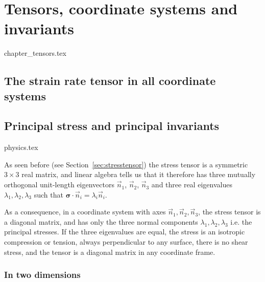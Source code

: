 \chapter{Tensors, coordinate systems and invariants}
\begin{flushright} {\tiny {\color{gray} chapter\_tensors.tex}} \end{flushright}


\section{The strain rate tensor in all coordinate systems}


\newpage
\section{Principal stress and principal invariants} \label{sec:princ_stress}
\begin{flushright} {\tiny {\color{gray} physics.tex}} \end{flushright}


As seen before (see Section~\ref{sec:stresstensor}) 
the stress tensor is a symmetric $3\times3$ real matrix, and linear algebra tells us that it 
therefore has three mutually orthogonal unit-length eigenvectors $\vec{n}_{1}$, $\vec{n}_{2}$, 
$\vec{n}_{3}$ and three real eigenvalues $\lambda _{1},\lambda _{2},\lambda _{3}$ 
such that ${\bm \sigma}\!\cdot\! \vec{n}_i=\lambda_{i} \vec{n}_{i}$.

As a consequence, in a coordinate system with axes $\vec{n}_{1},\vec{n}_{2},\vec{n}_{3}$, 
the stress tensor is a diagonal matrix, and has only the three normal components $\lambda _{1},\lambda _{2},\lambda _{3}$
i.e. the principal stresses. If the three eigenvalues are equal, the stress is an isotropic compression or tension, always perpendicular to any surface, there is no shear stress, and the tensor is a diagonal matrix in any coordinate frame.

\subsection{In two dimensions}

